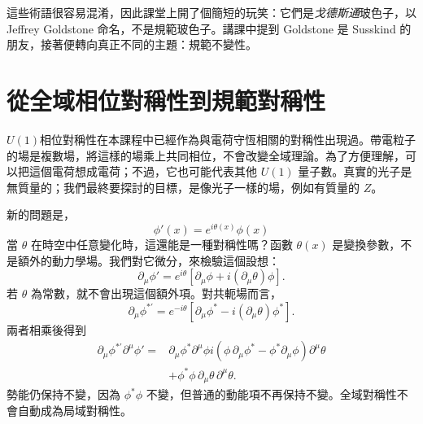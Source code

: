 這些術語很容易混淆，因此課堂上開了個簡短的玩笑：它們是\emph{戈德斯通}玻色子，以 Jeffrey Goldstone 命名，不是規範玻色子。講課中提到 Goldstone 是 Susskind 的朋友，接著便轉向真正不同的主題：規範不變性。

\section{從全域相位對稱性到規範對稱性}

\(U(1)\)相位對稱性在本課程中已經作為與電荷守恆相關的對稱性出現過。帶電粒子的場是複數場，將這樣的場乘上共同相位，不會改變全域理論。為了方便理解，可以把這個電荷想成電荷；不過，它也可能代表其他 \(U(1)\) 量子數。真實的光子是無質量的；我們最終要探討的目標，是像光子一樣的場，例如有質量的 \(Z\)。

新的問題是，
\begin{equation}
  \phi'(x)=e^{i\theta(x)}\phi(x)
  \label{eq:l07-local-u1}
\end{equation}
當 \(\theta\) 在時空中任意變化時，這還能是一種對稱性嗎？函數 \(\theta(x)\) 是變換參數，不是額外的動力學場。我們對它微分，來檢驗這個設想：
\begin{equation}
  \partial_\mu\phi'
  =e^{i\theta}
   \left[\partial_\mu\phi+i(\partial_\mu\theta)\phi\right].
  \label{eq:l07-local-derivative}
\end{equation}
若 \(\theta\) 為常數，就不會出現這個額外項。對共軛場而言，
\begin{equation}
  \partial_\mu\phi^{*\prime}
  =e^{-i\theta}
   \left[\partial_\mu\phi^*-i(\partial_\mu\theta)\phi^*\right].
\end{equation}
兩者相乘後得到
\begin{align}
  \partial_\mu\phi^{*\prime}\partial^\mu\phi'
  ={}&
  \partial_\mu\phi^*\partial^\mu\phi
  i\left(
      \phi\,\partial_\mu\phi^*
      -\phi^*\partial_\mu\phi
    \right)\partial^\mu\theta
  \nonumber\\
  &+\phi^*\phi\,
    \partial_\mu\theta\,\partial^\mu\theta.
  \label{eq:l07-local-failure}
\end{align}
勢能仍保持不變，因為 \(\phi^*\phi\) 不變，但普通的動能項不再保持不變。全域對稱性不會自動成為局域對稱性。

\begin{classroomqa}
\end{classroomqa}

